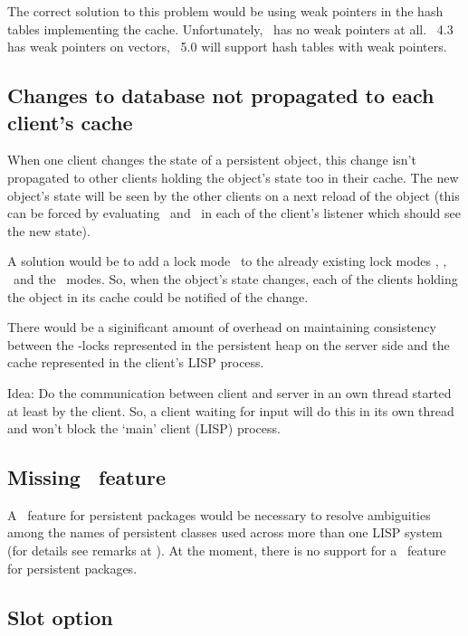 The correct solution to this problem would be using weak pointers in
the hash tables implementing the cache. Unfortunately, \lwcl\ has no
weak pointers at all. \allegrocl\ 4.3 has weak pointers on vectors,
\allegrocl\ 5.0 will support hash tables with weak pointers.

\subsection{Changes to database not propagated to each client's cache}

When one client changes the state of a persistent object, this change
isn't propagated to other clients holding the object's state too in
their cache. The new object's state will be seen by the other
clients on a next reload of the object (this can be forced by
evaluating \ and \ in each of the client's listener which should see the
new state).

A solution would be to add a lock mode \ to the already
existing lock modes , , \ and
the \ modes. So, when the object's state changes,
each of the clients holding the object in its cache could be notified
of the change.

There would be a siginificant amount of overhead on maintaining
consistency between the -locks represented in the
persistent heap on the server side and the cache represented in the
client's LISP process.

Idea: Do the communication between client and server in an own thread
started at least by the client. So, a client waiting for input will do
this in its own thread and won't block the `main' client (LISP)
process.

\subsection[Missing `use-package' feature]{Missing
  \protect{}\ feature}%
\label{sec:MissingUsePackage}

A \ feature for persistent packages would be
necessary to resolve ambiguities among the names of persistent classes
used across more than one LISP system (for details see remarks at
). At the moment, there is no support for a
\ feature for persistent packages.

\subsection[Slot option :extent :persistent]{Slot option
  \protect{}\protect\lisp{\ %
    }\protect{}}

